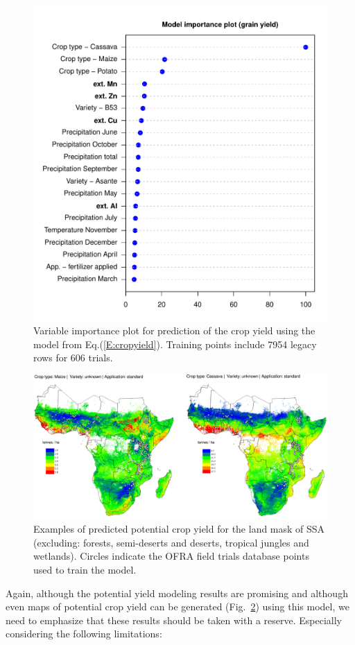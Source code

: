 \begin{linenumbers}
\begin{figure}[!htb]
\includegraphics[width=.75\textwidth]{Fig_variable_importance_grainyield.pdf}
\caption{Variable importance plot for prediction of the crop yield using the model from Eq.(\ref{E:cropyield}). Training points include 7954 legacy rows for 606 trials.}
\label{fig:variable_importance_cropyield}
\end{figure}

\begin{figure}[!htb]
\includegraphics[width=1.1\textwidth]{Fig_grainyield_maps.png}
\caption{Examples of predicted potential crop yield for the land mask of SSA (excluding: forests, semi-deserts and deserts, tropical jungles and wetlands). Circles indicate the OFRA field trials database points used to train the model.}
\label{fig:cropyield_maps}
\end{figure}

Again, although the potential yield modeling results are promising and although even maps of potential crop yield can be generated (Fig.\@~\ref{fig:cropyield_maps}) using this model, we need to emphasize that these results should be taken with a reserve. Especially considering the following limitations:


\end{linenumbers}
